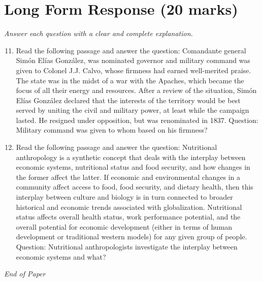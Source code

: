 \documentclass[12pt]{article}
\begin{document}
\section*{Long Form Response (20 marks)}
\textit{Answer each question with a clear and complete explanation.}
\begin{enumerate}[label=\arabic*.]
\setcounter{enumi}{10}
\item Read the following passage and answer the question: Comandante general Simón Elías González, was nominated governor and military command was given to Colonel J.J. Calvo, whose firmness had earned well-merited praise. The state was in the midst of a war with the Apaches, which became the focus of all their energy and resources. After a review of the situation, Simón Elías González declared that the interests of the territory would be best served by uniting the civil and military power, at least while the campaign lasted. He resigned under opposition, but was renominated in 1837. Question: Military command was given to whom based on his firmness?
\item Read the following passage and answer the question: Nutritional anthropology is a synthetic concept that deals with the interplay between economic systems, nutritional status and food security, and how changes in the former affect the latter. If economic and environmental changes in a community affect access to food, food security, and dietary health, then this interplay between culture and biology is in turn connected to broader historical and economic trends associated with globalization. Nutritional status affects overall health status, work performance potential, and the overall potential for economic development (either in terms of human development or traditional western models) for any given group of people. Question: Nutritional anthropologists investigate the interplay between economic systems and what?
\end{enumerate}

\vfill
\noindent\textit{End of Paper}
\end{document}
